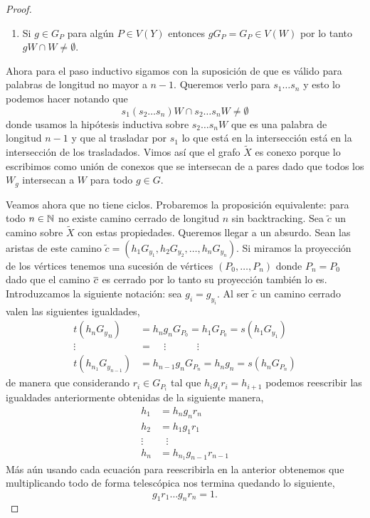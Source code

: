 \documentclass[tesis.tex]{subfiles}
\begin{document}
\begin{proof}
\begin{enumerate}
		\item Si $g \in G_P$ para algún $P \in V(Y)$ entonces $g G_P = G_P \in V(W)$ por lo tanto $gW \cap W \neq \emptyset$. 
	\end{enumerate} 
	Ahora para el paso inductivo sigamos con la suposición de que es válido para palabras de longitud no mayor a $n-1$. 
	Queremos verlo para $s_1\dots s_n$ y esto lo podemos hacer notando que 
	\[
	s_1(s_2 \dots s_n) W \cap s_2 \dots s_{n} W \neq \emptyset 
	\]
	donde usamos la hipótesis inductiva sobre $s_2 \dots s_n W$ que es una palabra de longitud $n-1$ y que al trasladar por $s_1$ lo que está en la intersección está en la intersección de los trasladados.
	Vimos así que el grafo $\tilde X$ es conexo porque lo escribimos como unión de conexos que se intersecan de a pares dado que todos los $W_g$ intersecan a $W$ para todo $g \in G$.
	
	Veamos ahora que no tiene ciclos.
	Probaremos la proposición equivalente: para todo $n \in \mathbb{N}$ no existe camino cerrado de longitud $n$ sin backtracking.
	Sea $\tilde c$ un camino sobre $\tilde X$ con estas propiedades. 
	Queremos llegar a un absurdo.
	Sean las aristas de este camino $\tilde c = (h_1G_{y_1}, h_2 G_{y_2}, \dots, h_n G_{y_n})$.
	Si miramos la proyección de los vértices tenemos una sucesión de vértices $(P_0, \dots, P_n)$ donde $P_n = P_0$ dado que el camino $\overline c$ es cerrado por lo tanto su proyección también lo es.
	Introduzcamos la siguiente notación: sea $g_i = g_{y_i}$.
	Al ser $\tilde c$ un camino cerrado valen las siguientes igualdades,
	\begin{align*}
		t(h_n{G_y}_n) &= h_ng_nG_{P_0} = h_1G_{P_0} = s(h_1G_{ y_1}) \\ 
		\vdots \ \ \  &= \ \ \ \ \    \vdots\ \ \ \ \ \ \ \ \ \ \ \ \ \    \vdots \\
		t(h_{n_1}G_{y_{n-1}}) &= h_{n-1}g_{n}G_{P_n} = h_{n}g_n = s(h_nG_{P_n} )  
	\end{align*}
	de manera que considerando $r_i \in G_{P_i}$ tal que $h_ig_ir_i = h_{i+1}$ 	podemos reescribir las igualdades anteriormente obtenidas de la siguiente manera,
	\begin{align*}
		h_1 &= h_{n}g_{n}r_{n} \\
		h_2 &= h_1g_1r_1 \\
		\vdots & \ \ \ \vdots \\
		h_n &= h_{n_1}g_{n-1}r_{n-1} 
	\end{align*}
	Más aún usando cada ecuación para reescribirla en la anterior obtenemos que multiplicando todo de forma telescópica nos termina quedando lo siguiente,
	\begin{equation*}
		g_1r_1\dots g_nr_n = 1.
	\end{equation*} 
	

\end{proof}
\end{document}
